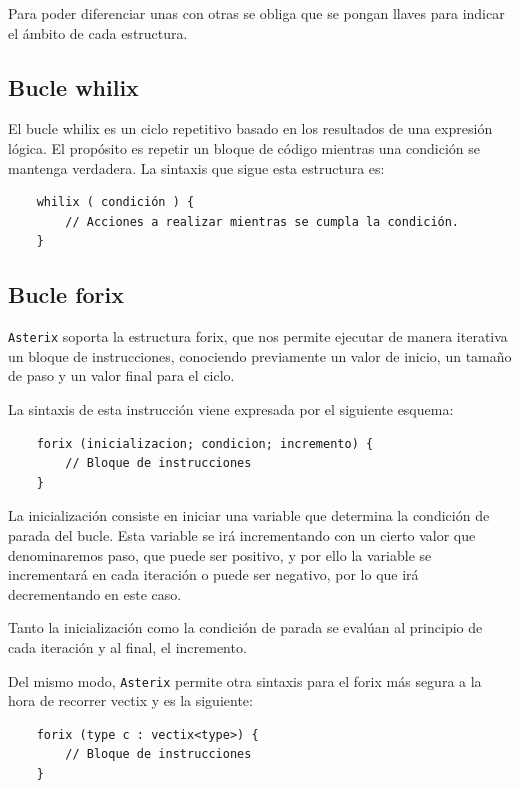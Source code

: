 \documentclass[a4paper, 10pt]{article}
\newcommand{\atx}{\texttt{Asterix} }
\begin{document}
    Para poder diferenciar unas con otras se obliga que se pongan llaves para
    indicar el ámbito de cada estructura.

    \subsection*{Bucle whilix}
    El bucle whilix es un ciclo repetitivo basado en los resultados
    de una expresión lógica. El propósito es repetir un bloque de código
    mientras una condición se mantenga verdadera. La sintaxis que sigue esta
    estructura es:

    \begin{verbatim}
    whilix ( condición ) {
        // Acciones a realizar mientras se cumpla la condición.
    }
    \end{verbatim}
    
    \subsection*{Bucle forix}
    \atx soporta la estructura \textsf{forix}, que nos permite ejecutar de
    manera iterativa un bloque de instrucciones, conociendo previamente un
    valor de inicio, un tamaño de paso y un valor final para el ciclo.
    
    La sintaxis de esta instrucción viene expresada por el siguiente esquema:
    
    \begin{verbatim}
    forix (inicializacion; condicion; incremento) {
        // Bloque de instrucciones
    }
    \end{verbatim}
    
    La inicialización consiste en iniciar una variable que determina la
    condición de parada del bucle. Esta variable se irá incrementando con un
    cierto valor que denominaremos paso, que puede ser positivo, y por ello la
    variable se incrementará en cada iteración o puede ser negativo, por lo que
    irá decrementando en este caso.
    
    Tanto la inicialización como la condición de parada se evalúan al principio
    de cada iteración y al final, el incremento.

    Del mismo modo, \atx permite otra sintaxis para el forix más segura a la hora
    de recorrer vectix y es la siguiente:

    \begin{verbatim}
    forix (type c : vectix<type>) {
        // Bloque de instrucciones
    }
    \end{verbatim}
\end{document}
